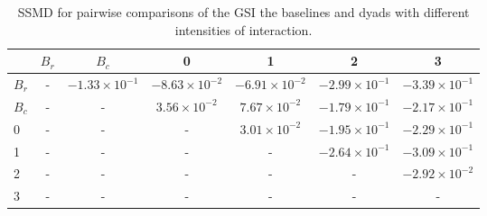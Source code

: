 \begin{table}
\centering
\caption{SSMD for pairwise comparisons of the GSI the baselines and dyads with different intensities of interaction.}
\label{tab:ssmd_gsi}
\begin{tabular}{lcccccc}
\toprule
 & $B_r$ & $B_c$ & 0 & 1 & 2 & 3 \\
\midrule
$B_r$ & - & $-1.33 \times 10^{-1}$ & $-8.63 \times 10^{-2}$ & $-6.91 \times 10^{-2}$ & $-2.99 \times 10^{-1}$ & $-3.39 \times 10^{-1}$ \\
$B_c$ & - & - & $3.56 \times 10^{-2}$ & $7.67 \times 10^{-2}$ & $-1.79 \times 10^{-1}$ & $-2.17 \times 10^{-1}$ \\
0 & - & - & - & $3.01 \times 10^{-2}$ & $-1.95 \times 10^{-1}$ & $-2.29 \times 10^{-1}$ \\
1 & - & - & - & - & $-2.64 \times 10^{-1}$ & $-3.09 \times 10^{-1}$ \\
2 & - & - & - & - & - & $-2.92 \times 10^{-2}$ \\
3 & - & - & - & - & - & - \\
\bottomrule
\end{tabular}
\end{table}
